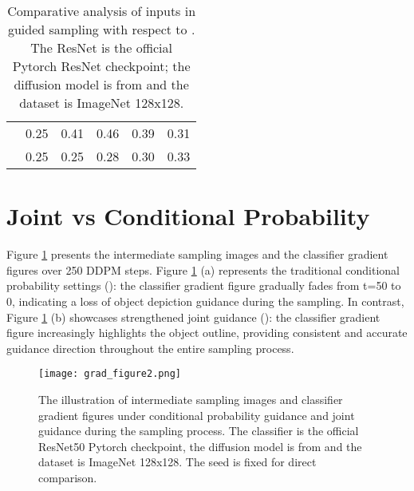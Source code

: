 \documentclass{article}
\theoremstyle{definition}
\begin{document}
\begin{table}[h!]
\caption{Comparative analysis of inputs in guided sampling with respect to . The ResNet is the official Pytorch ResNet checkpoint; the diffusion model is from \cite{dhariwal2021diffusion} and the dataset is ImageNet 128x128.}
\label{table:compare_xt_x0_ece}
\begin{center}
\begin{small}
\begin{sc}
\begin{tabular}{lccccc}
\toprule
     &  &  &  &  &   \\
\midrule     
   & 0.25 & 0.41 & 0.46 & 0.39 & 0.31\\
  &0.25& 0.25& 0.28&0.30& 0.33\\
\bottomrule
\end{tabular}
\end{sc}
\end{small}
\end{center}
\end{table}







\section{Joint vs Conditional Probability}

Figure \ref{fig:grad_figure2} presents the intermediate sampling images and the classifier gradient figures over 250 DDPM steps. Figure \ref{fig:grad_figure2} (a) represents the traditional conditional probability settings (): the classifier gradient figure gradually fades from t=50 to 0, indicating a loss of object depiction guidance during the sampling. In contrast, Figure \ref{fig:grad_figure2} (b) 
showcases strengthened joint guidance (): the classifier gradient figure increasingly highlights the object outline, providing consistent and accurate guidance direction throughout the entire sampling process.


\begin{figure}[h]
  \centering
\texttt{[image: grad\_figure2.png]}
  \caption{The illustration of intermediate sampling images and classifier gradient figures under conditional probability guidance and joint guidance during the sampling process.  The classifier is the official ResNet50 Pytorch checkpoint, the diffusion model is from \cite{dhariwal2021diffusion} and the dataset is ImageNet 128x128. The seed is fixed for direct comparison.}
  \label{fig:grad_figure2}
\end{figure}
\end{document}
